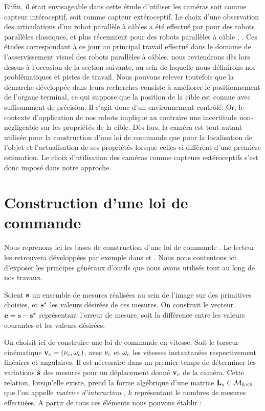 Enfin, il était envisageable dans cette étude d'utiliser les caméras soit comme 
capteur intéroceptif, soit comme capteur extéroceptif. Le choix d'une 
observation des articulations d'un robot parallèle à câbles a été effectué par 
\cite{andreff2007} pour des robots parallèles classiques, et plus récemment 
pour des robots parallèles à câble \cite{dallej2011}, \cite{dallej2012}. Ces études 
correspondant à ce jour au principal travail effectué dans le domaine de 
l'asservissement visuel des robots parallèles à câbles, nous reviendrons dès 
lors dessus à l'occasion de la section suivante, au sein de laquelle nous 
définirons nos problématiques et pistes de travail. Nous pouvons relever 
toutefois que la démarche développée dans leurs recherches consiste à améliorer 
le positionnement de l'organe terminal, ce qui suppose que la position de la 
cible est connue avec suffisamment de précision. Il s'agit donc d'un 
environnement contrôlé. Or, le contexte d'application de nos robots implique au 
contraire une incertitude non-négligeable sur les propriétés de la cible. Dès 
lors, la caméra est tout autant utilisée pour la construction d'une loi de 
commande que pour la localisation de l'objet et l'actualisation de ses 
propriétés lorsque celles-ci diffèrent d'une première estimation. Le choix 
d'utilisation des caméras comme capteurs extéroceptifs s'est donc imposé dans 
notre approche.

\section{Construction d'une loi de commande}\label{chap1-1-2}

Nous reprenons ici les bases de construction d'une loi de commande 
\cite{samson1991}. Le lecteur les retrouvera développées par exemple dans 
\cite{chaumette:tuto01} et \cite{chaumette:tuto02}. Nous nous contentons ici 
d'exposer les principes généraux d'outils que nous avons utilisés tout au long 
de nos travaux.

Soient ${\bf s}$ un ensemble de mesures réalisées au sein de l'image sur des 
primitives choisies, et ${\bf s}^*$ les valeurs désirées de ces mesures. On 
construit le vecteur ${\bf e} = {\bf s} - {\bf s}^*$ représentant l'erreur de 
mesure, soit la différence entre les valeurs courantes et les valeurs désirées.

On choisit ici de construire une loi de commande en vitesse. Soit le torseur 
cinématique ${\bf v}_c = ({\bf \nu}_c, {\bf \omega}_c)$, avec ${\bf \nu}_c$ et 
${\bf \omega}_c$ les vitesses instantanées respectivement linéaires et 
angulaires. Il est nécessaire dans un premier temps de déterminer les 
variations $\dot {\bf s}$ des mesures pour un déplacement donné ${\bf v}_c$ de 
la caméra. Cette relation, lorsqu'elle existe, prend la forme algébrique d'une 
matrice ${\bf L}_s \in \mathcal M_{k\times 6}$ que l'on appelle {\it matrice 
d'interaction} \cite{espiau1992}, $k$ représentant le nombres de mesures 
effectuées. A partir de tous ces éléments nous pouvons établir :

